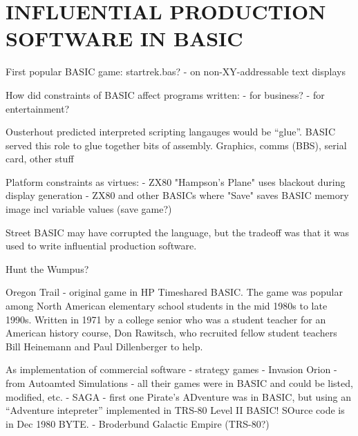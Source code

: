 

\section{INFLUENTIAL PRODUCTION SOFTWARE IN BASIC}

First popular BASIC game: startrek.bas?
  - on non-XY-addressable text displays


How did constraints of BASIC affect programs written:
- for business?
- for entertainment?

Ousterhout predicted interpreted scripting langauges would be ``glue''.
BASIC served this role to glue together bits of assembly.  Graphics,
comms (BBS), serial card, other stuff


Platform constraints as virtues:
 - ZX80 "Hampson's Plane" uses blackout during display generation 
 - ZX80 and other BASICs where "Save" saves BASIC memory image incl
 variable values (save game?)



Street BASIC may have corrupted the language, but the tradeoff was that
it was used to write influential production software.


Hunt the Wumpus?


Oregon Trail - original game in HP Timeshared BASIC.  The game was popular among
North American elementary school students in the mid 1980s to late
1990s.  Written  in 1971 by a college senior who was a student teacher for an
American history course, Don Rawitsch, who recruited fellow student
teachers Bill Heinemann and Paul Dillenberger to help.

As implementation of commercial software - strategy games
  - Invasion Orion - from Autoamted Simulations - all their games were
  in BASIC and could be listed, modified, etc.
  - SAGA - first one Pirate's ADventure was in BASIC, but using an
  ``Adventure intepreter'' implemented in TRS-80 Level II BASIC!  SOurce
  code is in Dec 1980 BYTE.
  - Broderbund Galactic Empire (TRS-80?)


